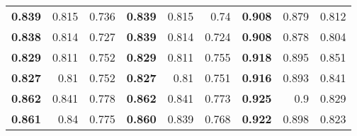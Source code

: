 \begin{tabular}{lrrlrrlrr}
\toprule
 \bfseries 0.839 & 0.815 & 0.736 & \bfseries 0.839 & 0.815 & 0.74  & \bfseries 0.908 & 0.879 & 0.812 \\
 \bfseries 0.838 & 0.814 & 0.727 & \bfseries 0.839 & 0.814 & 0.724 & \bfseries 0.908 & 0.878 & 0.804 \\
 \bfseries 0.829 & 0.811 & 0.752 & \bfseries 0.829 & 0.811 & 0.755 & \bfseries 0.918 & 0.895 & 0.851 \\
 \bfseries 0.827 & 0.81  & 0.752 & \bfseries 0.827 & 0.81  & 0.751 & \bfseries 0.916 & 0.893 & 0.841 \\
 \bfseries 0.862 & 0.841 & 0.778 & \bfseries 0.862 & 0.841 & 0.773 & \bfseries 0.925 & 0.9   & 0.829 \\
 \bfseries 0.861 & 0.84  & 0.775 & \bfseries 0.860 & 0.839 & 0.768 & \bfseries 0.922 & 0.898 & 0.823 \\
\bottomrule
\end{tabular}